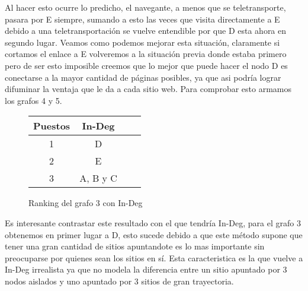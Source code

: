 Al hacer esto ocurre lo predicho, el navegante, a menos que se teletransporte, pasara por E siempre, sumando a esto las veces que visita directamente a E debido a una teletransportación se vuelve entendible por que D esta ahora en segundo lugar. Veamos como podemos mejorar esta situación, claramente si cortamos el enlace a E volveremos a la situación previa donde estaba primero pero de ser esto imposible creemos que lo mejor que puede hacer el nodo D es conectarse a la mayor cantidad de páginas posibles, ya que asi podría lograr difuminar la ventaja que le da a cada sitio web. Para comprobar esto armamos los grafos 4 y 5.

\begin{figure}[H]
\centering
\begin{tabular}{| c | c | c | c |}
  \hline
  Puestos & In-Deg\\ \hline \hline
  1 & D\\ \hline
  2 & E\\ \hline
  3 & A, B y C\\ \hline
\end{tabular}
  \caption{\footnotesize{Ranking del grafo 3 con In-Deg}}
  \label{fig:Rankings}
\end{figure}


Es interesante contrastar este resultado con el que tendría In-Deg, para el grafo 3 obtenemos en primer lugar a D, esto sucede debido a que este método supone que tener una gran cantidad de sitios apuntandote es lo mas importante sin preocuparse por quienes sean los sitios en sí. Esta caracteristica es la que vuelve a In-Deg irrealista ya que no modela la diferencia entre un sitio apuntado por 3 nodos aislados y uno apuntado por 3 sitios de gran trayectoria.

